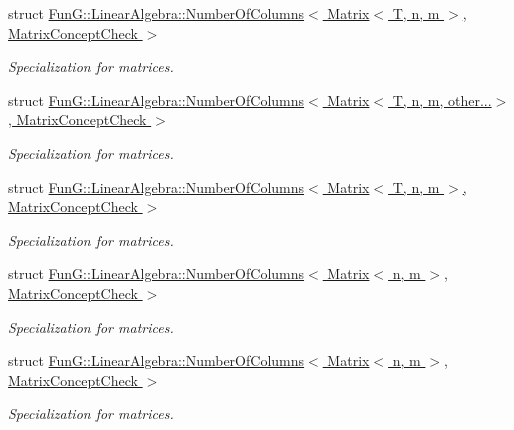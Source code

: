 \begin{DoxyCompactItemize}
struct \hyperlink{structFunG_1_1LinearAlgebra_1_1NumberOfColumns_3_01Matrix_3_01T_00_01n_00_01m_01_4_00_01MatrixConceptCheck_01_4}{Fun\+G\+::\+Linear\+Algebra\+::\+Number\+Of\+Columns$<$ Matrix$<$ T, n, m $>$, Matrix\+Concept\+Check $>$}
\begin{DoxyCompactList}\small\item\em Specialization for matrices. \end{DoxyCompactList}\item 
struct \hyperlink{structFunG_1_1LinearAlgebra_1_1NumberOfColumns_3_01Matrix_3_01T_00_01n_00_01m_00_01other_8_8_8_4_00_01MatrixConceptCheck_01_4}{Fun\+G\+::\+Linear\+Algebra\+::\+Number\+Of\+Columns$<$ Matrix$<$ T, n, m, other...$>$, Matrix\+Concept\+Check $>$}
\begin{DoxyCompactList}\small\item\em Specialization for matrices. \end{DoxyCompactList}\item 
struct \hyperlink{structFunG_1_1LinearAlgebra_1_1NumberOfColumns_3_01Matrix_3_01T_00_01n_00_01m_01_4_00_01MatrixConceptCheck_01_4}{Fun\+G\+::\+Linear\+Algebra\+::\+Number\+Of\+Columns$<$ Matrix$<$ T, n, m $>$, Matrix\+Concept\+Check $>$}
\begin{DoxyCompactList}\small\item\em Specialization for matrices. \end{DoxyCompactList}\item 
struct \hyperlink{structFunG_1_1LinearAlgebra_1_1NumberOfColumns_3_01Matrix_3_01n_00_01m_01_4_00_01MatrixConceptCheck_01_4}{Fun\+G\+::\+Linear\+Algebra\+::\+Number\+Of\+Columns$<$ Matrix$<$ n, m $>$, Matrix\+Concept\+Check $>$}
\begin{DoxyCompactList}\small\item\em Specialization for matrices. \end{DoxyCompactList}\item 
struct \hyperlink{structFunG_1_1LinearAlgebra_1_1NumberOfColumns_3_01Matrix_3_01n_00_01m_01_4_00_01MatrixConceptCheck_01_4}{Fun\+G\+::\+Linear\+Algebra\+::\+Number\+Of\+Columns$<$ Matrix$<$ n, m $>$, Matrix\+Concept\+Check $>$}
\begin{DoxyCompactList}\small\item\em Specialization for matrices. \end{DoxyCompactList}\end{DoxyCompactItemize}
